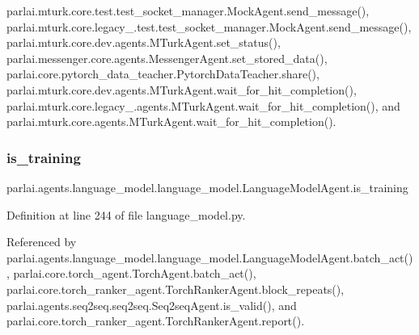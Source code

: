 parlai.\+mturk.\+core.\+test.\+test\+\_\+socket\+\_\+manager.\+Mock\+Agent.\+send\+\_\+message(), parlai.\+mturk.\+core.\+legacy\+\_.\+test.\+test\+\_\+socket\+\_\+manager.\+Mock\+Agent.\+send\+\_\+message(), parlai.\+mturk.\+core.\+dev.\+agents.\+M\+Turk\+Agent.\+set\+\_\+status(), parlai.\+messenger.\+core.\+agents.\+Messenger\+Agent.\+set\+\_\+stored\+\_\+data(), parlai.\+core.\+pytorch\+\_\+data\+\_\+teacher.\+Pytorch\+Data\+Teacher.\+share(), parlai.\+mturk.\+core.\+dev.\+agents.\+M\+Turk\+Agent.\+wait\+\_\+for\+\_\+hit\+\_\+completion(), parlai.\+mturk.\+core.\+legacy\+\_.\+agents.\+M\+Turk\+Agent.\+wait\+\_\+for\+\_\+hit\+\_\+completion(), and parlai.\+mturk.\+core.\+agents.\+M\+Turk\+Agent.\+wait\+\_\+for\+\_\+hit\+\_\+completion().

\mbox{\label{classparlai_1_1agents_1_1language__model_1_1language__model_1_1LanguageModelAgent_ae4a04c916f52bdd6d5163d36d49aa378}} 
\subsubsection{\texorpdfstring{is\+\_\+training}{is\_training}}
{\footnotesize\ttfamily parlai.\+agents.\+language\+\_\+model.\+language\+\_\+model.\+Language\+Model\+Agent.\+is\+\_\+training}



Definition at line 244 of file language\+\_\+model.\+py.



Referenced by parlai.\+agents.\+language\+\_\+model.\+language\+\_\+model.\+Language\+Model\+Agent.\+batch\+\_\+act(), parlai.\+core.\+torch\+\_\+agent.\+Torch\+Agent.\+batch\+\_\+act(), parlai.\+core.\+torch\+\_\+ranker\+\_\+agent.\+Torch\+Ranker\+Agent.\+block\+\_\+repeats(), parlai.\+agents.\+seq2seq.\+seq2seq.\+Seq2seq\+Agent.\+is\+\_\+valid(), and parlai.\+core.\+torch\+\_\+ranker\+\_\+agent.\+Torch\+Ranker\+Agent.\+report().

\mbox{\label{classparlai_1_1agents_1_1language__model_1_1language__model_1_1LanguageModelAgent_a8be32c6f1a5b35f4c508c9dc1ca911b8}} 
